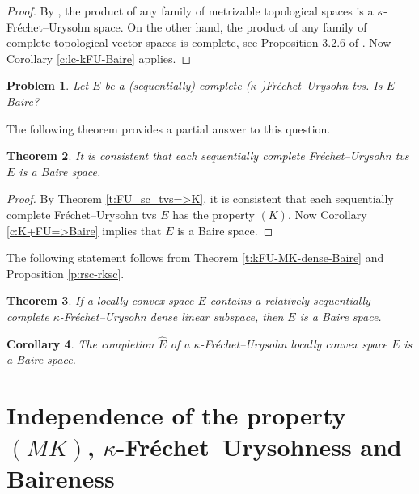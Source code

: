 \documentclass[preprint,11pt]{elsarticle}
\newtheorem{theorem}{Theorem}[section]
\newtheorem{corollary}[theorem]{Corollary}
\newtheorem{problem}[theorem]{Problem}
\theoremstyle{definition}
\theoremstyle{remark}
\numberwithin{equation}{section}
\numberwithin{theorem}{section}
\begin{document}
\begin{proof}
By \cite[Theorem~3.1]{Mrowka}, the product of any family of metrizable topological spaces is a $\kappa$-Fr\'{e}chet--Urysohn space. On the other hand, the product of any family of complete topological vector spaces is complete, see Proposition 3.2.6 of \cite{Jar}. Now Corollary \ref{c:lc-kFU-Baire} applies.
\end{proof}

\begin{problem}
Let $E$ be a  {\rm(}sequentially{\rm)} complete  {\rm(}$\kappa$-{\rm)}Fr\'{e}chet--Urysohn tvs. Is $E$ Baire?
\end{problem}


The following theorem provides a partial answer to this question.

\begin{theorem} \label{t:FU_sc_tvs-Baire}
It is consistent that each sequentially complete Fr\'{e}chet--Urysohn tvs $E$ is a Baire space.
\end{theorem}
\begin{proof}
By Theorem \ref{t:FU_sc_tvs=>K}, it is consistent that each sequentially complete Fr\'{e}chet--Urysohn tvs $E$ has the property $(K)$. Now Corollary \ref{c:K+FU=>Baire} %
implies that $E$ is a Baire space.
\end{proof}



The following statement follows from Theorem \ref{t:kFU-MK-dense-Baire} and Proposition \ref{p:rsc-rksc}.

\begin{theorem} \label{t:kFU_rsc-Baire}
If a locally convex space $E$ contains a relatively sequentially complete  $\kappa$-Fr\'{e}chet--Urysohn dense linear subspace, then $E$ is a Baire space.
\end{theorem}

\begin{corollary} \label{c:kFU_complete-Baire}
The completion $\widehat E$ of a $\kappa$-Fr\'{e}chet--Urysohn locally convex space $E$ is a Baire space.
\end{corollary}





\section{ Independence of  the property $(MK)$, $\kappa$-Fr\'{e}chet--Urysohness and Baireness}\label{exa:feral-Baire}
\end{document}
